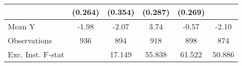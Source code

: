 {\begin{tabular}{l*{5}{c}}
            &     (0.264)         &     (0.354)         &     (0.287)         &     (0.269)         &                     \\
\midrule
Mean Y      &       -1.98         &       -2.07         &        3.74         &       -0.57         &       -2.10         \\
Observations&         936         &         894         &         918         &         898         &         874         \\
Exc. Inst. F-stat&                     &      17.149         &      55.838         &      61.522         &      50.886         \\
\bottomrule
\end{tabular}
}
